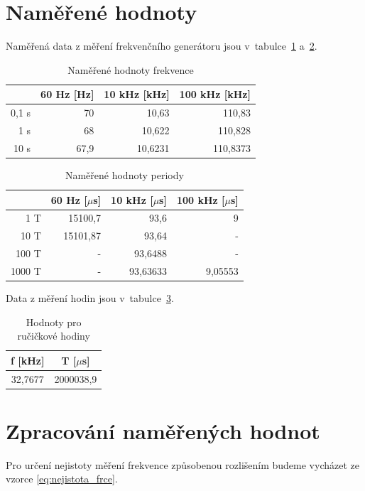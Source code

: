 \documentclass[a4paper,12pt]{article}   %
\newcommand{\tmu}{$\mu$}
\begin{document}
\section{Naměřené hodnoty}
Naměřená data z měření frekvenčního generátoru jsou v~tabulce~\ref{tab:frce} a~\ref{tab:perioda}.

\begin{table}[h!]
  \centering
  \begin{tabular}{|r|r|r|r|}
    \hline
      &60 Hz [Hz]&10 kHz [kHz]&100 kHz [kHz]\\\hline\hline
    0,1 s&70&10,63&110,83\\\hline
    1 s&68&10,622&110,828\\\hline
    10 s&67,9&10,6231&110,8373\\\hline
  \end{tabular}
  \label{tab:frce}
  \caption{Naměřené hodnoty frekvence}
\end{table}

\begin{table}[h!]
  \centering
  \begin{tabular}{|r|r|r|r|}
    \hline
    &60 Hz [\tmu s]&10 kHz [\tmu s]&100 kHz [\tmu s]\\\hline\hline
    1 T&15100,7&93,6&9\\\hline
    10 T &15101,87&93,64&-\\\hline
    100 T&-&93,6488&-\\\hline
    1000 T&-&93,63633&9,05553\\\hline
  \end{tabular}
  \label{tab:perioda}
  \caption{Naměřené hodnoty periody}
\end{table}

Data z měření hodin jsou v~tabulce~\ref{tab:hodiny}.

\begin{table}
  \centering
  \begin{tabular}{|c|c|}
    \hline
    f [kHz]&T [\tmu s]\\\hline\hline
    32,7677&2000038,9\\\hline
  \end{tabular}
  \caption{Hodnoty pro ručičkové hodiny}
  \label{tab:hodiny}
\end{table}




\section{Zpracování naměřených hodnot}
Pro určení nejistoty měření frekvence způsobenou rozlišením budeme vycházet ze vzorce \ref{eq:nejistota_frce}.
\end{document}
